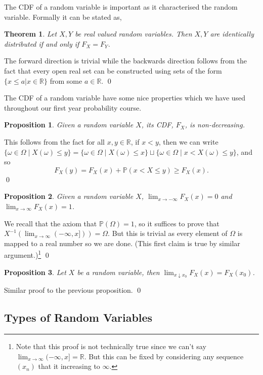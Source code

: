\documentclass[
]{article}
\newtheorem{theorem}{Theorem}
\newtheorem{prop}{Proposition}[theorem]
\theoremstyle{definition}
\begin{document}
The CDF of a random variable is important as it characterised the random
variable. Formally it can be stated as,

\begin{theorem}
  Let \(X, Y\) be real valued random variables. Then \(X, Y\) are identically 
  distributed if and only if \(F_X = F_Y\).
\end{theorem}
\proof

The forward direction is trivial while the backwards direction follows
from the fact that every open real set can be constructed using sets of
the form \(\{x \le a | x \in \mathbb{R}\}\) from some
\(a \in \mathbb{R}\). \qed

The CDF of a random variable have some nice properties which we have
used throughout our first year probability course.

\begin{prop}
  Given a random variable \(X\), its CDF, \(F_X\), is non-decreasing.
\end{prop}
\proof

This follows from the fact for all \(x, y \in \mathbb{R}\), if
\(x < y\), then we can write
\(\{\omega \in \Omega \mid X(\omega) \le y\}  = \{\omega \in \Omega \mid X(\omega) \le x\} \sqcup  \{\omega \in \Omega \mid x < X(\omega) \le y\}\),
and so \[F_X(y) = F_X(x) + \mathbb{P}(x < X \le y) \ge F_X(x).\] \qed

\begin{prop}
  Given a random variable \(X\), \(\lim_{x \to -\infty} F_X(x) = 0\) and 
  \(\lim_{x \to \infty} F_X(x) = 1\).
\end{prop}
\proof

We recall that the axiom that \(\mathbb{P}(\Omega) = 1\), so it suffices
to prove that \(X^{-1}(\lim_{x \to \infty} (-\infty, x])) = \Omega\).
But this is trivial as every element of \(\Omega\) is mapped to a real
number so we are done. (This first claim is true by similar
argument.)\footnote{Note that this proof 
  is not technically true since we can't say 
  \(\lim_{x \to \infty} (-\infty, x] = \mathbb{R}\). But this can be fixed by 
  considering any sequence \((x_n)\) that it increasing to \(\infty\).}
\qed

\begin{prop}
  Let \(X\) be a random variable, then 
  \(\lim_{x \downarrow x_0} F_X(x) = F_X(x_0)\).
\end{prop}
\proof

Similar proof to the previous proposition. \qed

\hypertarget{types-of-random-variables}{%
\subsection{Types of Random Variables}\label{types-of-random-variables}}
\end{document}
